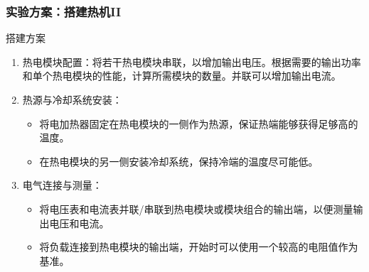 \documentclass[aspectratio=169]{beamer}
\newcounter{currentenumi}
\begin{document}
	\begin{frame}	
		\frametitle{实验方案：搭建热机II}	
		
		\begin{block}{搭建方案}
			\begin{enumerate}
				\item 热电模块配置：将若干热电模块串联，以增加输出电压。根据需要的输出功率和单个热电模块的性能，计算所需模块的数量。并联可以增加输出电流。
				
				\item 热源与冷却系统安装：
				\begin{itemize}
					\item \textcolor{c4}{将电加热器固定在热电模块的一侧作为热源，保证热端能够获得足够高的温度。}
					\item \textcolor{c4}{在热电模块的另一侧安装冷却系统，保持冷端的温度尽可能低。}
				\end{itemize}				
				
				\item 电气连接与测量：
				\begin{itemize}
					\item 将电压表和电流表并联/串联到热电模块或模块组合的输出端，以便测量输出电压和电流。
					\item 将负载连接到热电模块的输出端，开始时可以使用一个较高的电阻值作为基准。
				\end{itemize}
				
				\setcounter{currentenumi}{\theenumi}			
				
			\end{enumerate}
		\end{block}
		
	\end{frame}
	
\end{document}
